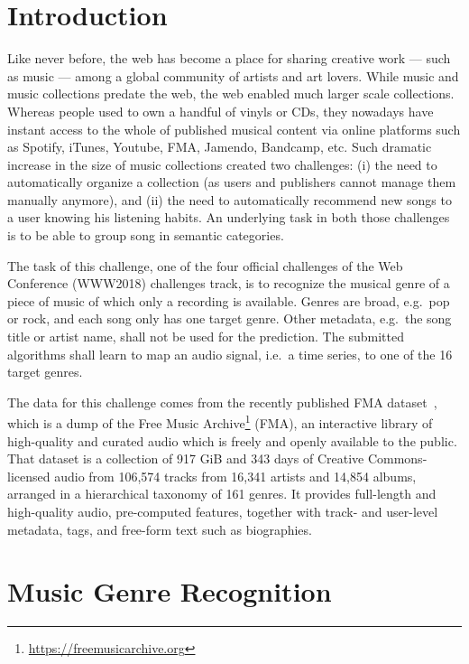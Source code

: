 \documentclass[sigconf]{acmart}
\begin{document}
\maketitle

\section{Introduction}

Like never before, the web has become a place for sharing creative work --- such as music --- among a global community of artists and art lovers. While music and music collections predate the web, the web enabled much larger scale collections. Whereas people used to own a handful of vinyls or CDs, they nowadays have instant access to the whole of published musical content via online platforms such as Spotify, iTunes, Youtube, FMA, Jamendo, Bandcamp, etc. Such dramatic increase in the size of music collections created two challenges: (i) the need to automatically organize a collection (as users and publishers cannot manage them manually anymore), and (ii) the need to automatically recommend new songs to a user knowing his listening habits. An underlying task in both those challenges is to be able to group song in semantic categories.

The task of this challenge, one of the four official challenges of the Web Conference (WWW2018) challenges track, is to recognize the musical genre of a piece of music of which only a recording is available. Genres are broad, e.g.\ pop or rock, and each song only has one target genre.
Other metadata, e.g.\ the song title or artist name, shall not be used for the prediction. The submitted algorithms shall learn to map an audio signal, i.e.\ a time series, to one of the 16 target genres.

The data for this challenge comes from the recently published FMA dataset~\cite{fma_dataset}, which is a dump of the Free Music Archive\footnote{\url{https://freemusicarchive.org}} (FMA), an interactive library of high-quality and curated audio which is freely and openly available to the public.
That dataset is a collection of 917 GiB and 343 days of Creative Commons-licensed audio from 106,574 tracks from 16,341 artists and 14,854 albums, arranged in a hierarchical taxonomy of 161 genres. It provides full-length and high-quality audio, pre-computed features, together with track- and user-level metadata, tags, and free-form text such as biographies.

\section{Music Genre Recognition}
\end{document}
